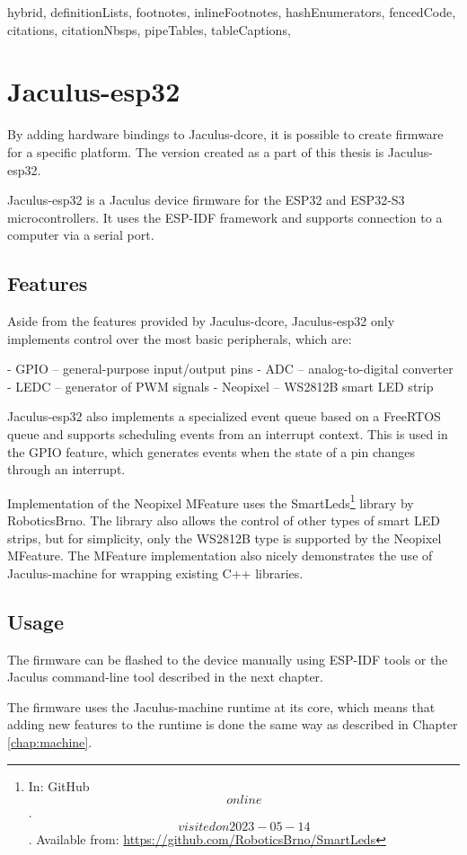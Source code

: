 \begin{markdown*}{%
  hybrid,
  definitionLists,
  footnotes,
  inlineFootnotes,
  hashEnumerators,
  fencedCode,
  citations,
  citationNbsps,
  pipeTables,
  tableCaptions,
}

\chapter{Jaculus-esp32}

By adding hardware bindings to Jaculus-dcore, it is possible to create firmware for a specific platform. The version created as a part of this thesis is Jaculus-esp32.

Jaculus-esp32 is a Jaculus device firmware for the ESP32 and ESP32-S3 microcontrollers. It uses the ESP-IDF framework and supports connection to a computer via a serial port.

\section{Features}

Aside from the features provided by Jaculus-dcore, Jaculus-esp32 only implements control over the most basic peripherals, which are:

  - GPIO -- general-purpose input/output pins
  - ADC -- analog-to-digital converter
  - LEDC -- generator of PWM signals
  - Neopixel -- WS2812B smart LED strip

Jaculus-esp32 also implements a specialized event queue based on a FreeRTOS queue and supports scheduling events from an interrupt context. This is used in the GPIO feature, which generates events when the state of a pin changes through an interrupt.

Implementation of the Neopixel MFeature uses the SmartLeds\footnote{In: GitHub \[online\]. \[visited on 2023-05-14\]. Available from: \url{https://github.com/RoboticsBrno/SmartLeds}} library by RoboticsBrno. The library also allows the control of other types of smart LED strips, but for simplicity, only the WS2812B type is supported by the Neopixel MFeature. The MFeature implementation also nicely demonstrates the use of Jaculus-machine for wrapping existing C++ libraries.

\section{Usage}

The firmware can be flashed to the device manually using ESP-IDF tools or the Jaculus command-line tool described in the next chapter.

The firmware uses the Jaculus-machine runtime at its core, which means that adding new features to the runtime is done the same way as described in Chapter \ref{chap:machine}.

\end{markdown*}
